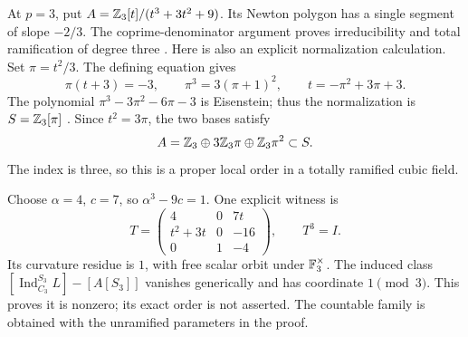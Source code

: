 \begin{example}\label{ex:shallow-wild-cubic}
At $p=3$, put $A=\mathbb Z_3[t]/(t^3+3t^2+9)$.
Its Newton polygon has a single segment of slope $-2/3$.
The coprime-denominator argument proves irreducibility and
total ramification of degree three
\citep[Corollary~3.18, p.~49]{WilliamsWuthrich2025}.
Here is also an explicit normalization calculation.
Set $\pi=t^2/3$.  The defining equation gives
\[
 \pi(t+3)=-3,\qquad
 \pi^3=3(\pi+1)^2,
 \qquad t=-\pi^2+3\pi+3.
\]
The polynomial $\pi^3-3\pi^2-6\pi-3$ is Eisenstein;
thus the normalization is $S=\mathbb Z_3[\pi]$
\citep[Theorem~5.9, pp.~67--68]{WilliamsWuthrich2025}.
Since $t^2=3\pi$, the two bases satisfy
\[
 A=\mathbb Z_3\oplus3\mathbb Z_3\pi\oplus\mathbb Z_3\pi^2\subset S.
\]
The index is three, so this is a proper local order in a
totally ramified cubic field.

Choose $\alpha=4$, $c=7$, so $\alpha^3-9c=1$.
One explicit witness is
\[
 T=\begin{pmatrix}
 4&0&7t\\t^2+3t&0&-16\\0&1&-4
 \end{pmatrix},\qquad T^3=I.
\]
Its curvature residue is $1$, with free scalar orbit under
$\mathbb F_3^\times$.
The induced class $[\operatorname{Ind}_{C_3}^{S_3}L]-[A[S_3]]$
vanishes generically and has coordinate $1\pmod3$.
This proves it is nonzero; its exact order is not asserted.
The countable family is obtained with the unramified
parameters in the proof.
\end{example}

